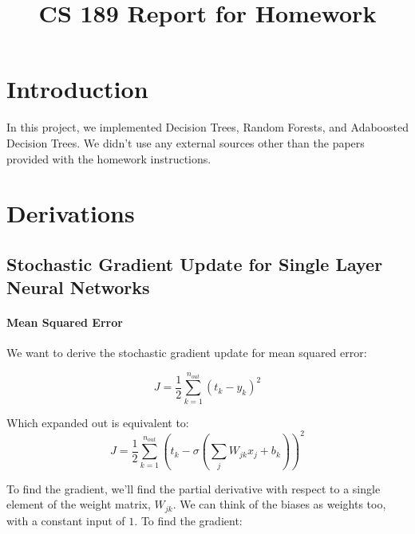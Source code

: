 \documentclass[11pt]{article}
\title{CS 189 Report for Homework \Homework}
\author{\Name}
\begin{document}
\maketitle

\section{Introduction}

In this project, we implemented Decision Trees, Random Forests, and Adaboosted Decision Trees. We didn't use any external sources other than the papers provided with the homework instructions. 

\section{Derivations}

\subsection{Stochastic Gradient Update for Single Layer Neural Networks}

\paragraph{Mean Squared Error} We want to derive the stochastic gradient update for mean squared error:

\[
	J = \frac{1}{2}\sum_{k=1}^{n_{out}}\left( t_k - y_k \right) ^2
\]

Which expanded out is equivalent to:
\[
	J = \frac{1}{2}\sum_{k=1}^{n_{out}}\left( t_k - \sigma \left( \sum_j W_{jk} x_j + b_k \right) \right) ^2
\]

To find the gradient, we'll find the partial derivative with respect to a single element of the weight matrix, $W_{jk}$. We can think of the biases as weights too, with a constant input of $1$. To find the gradient:
\end{document}
